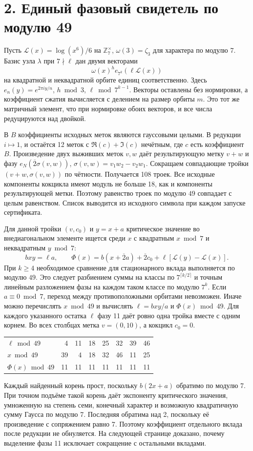 \documentclass[11pt,a4paper]{article}
\newcommand{\Z}{\mathbb Z}
\newcommand{\sect}[1]{\section*{\sffamily\color{ink}#1}}
\begin{document}
\newpage
\sect{2. Единый фазовый свидетель по модулю 49}
Пусть \(\mathcal L(x)=\log(x^6)/6\) на \(\Z_7^\times\), \(\omega(3)=\zeta_3\) для характера по модулю 7. Базис узла \(\lambda\) при \(7\nmid\ell\) дан двумя векторами
\[
   \omega(x)^h e_{7^k}(\ell\mathcal L(x))
\]
на квадратной и неквадратной орбите единиц соответственно. Здесь \(e_n(y)=e^{2\pi i y/n}\), \(h\bmod3\), \(\ell\bmod7^{k-1}\). Векторы оставлены без нормировки, а коэффициент сжатия вычисляется с делением на размер орбиты \(m\). Это тот же матричный элемент, что при нормировке обоих векторов, и все числа редуцируются над двойкой.

В \(B\) коэффициенты исходных меток являются гауссовыми целыми. В редукции \(i\mapsto1\), и остаётся 12 меток с \(\Re(c)+\Im(c)\) нечётным, где \(c\) есть коэффициент \(B\). Произведение двух выживших меток \(v,w\) даёт результирующую метку \(v+w\) и фазу \(e_N(\overline2\sigma(v,w))\), \(\sigma(v,w)=v_1w_2-v_2w_1\). Сокращаем совпадающие тройки \((v+w,\sigma(v,w))\) по чётности. Получается 108 троек. Все исходные компоненты кокцикла имеют модуль не больше 18, как и компоненты результирующей метки. Поэтому равенство троек по модулю \(49\) совпадает с целым равенством. Список выводится из исходного символа при каждом запуске сертификата.

Для данной тройки \((v,c_0)\) и \(y=x+a\) критическое значение во внедиагональном элементе ищется среди \(x\) с квадратным \(x\bmod7\) и неквадратным \(y\bmod7\):
\[
   bxy=\ell a,\qquad
   \Phi(x)=b(x+\overline2 a)+\overline2 c_0
                          +\ell[\mathcal L(y)-\mathcal L(x)] .  \tag{3}
\]
При \(k\ge4\) необходимое сравнение для стационарного вклада выполняется по модулю \(49\). Это следует разбиением суммы на классы по \(7^{\lceil k/2\rceil}\) и точным линейным разложением фазы на каждом таком классе по модулю \(7^k\). Если \(a\equiv0\bmod7\), переход между противоположными орбитами невозможен. Иначе можно перечислять \(x\bmod49\) и вычислять \(\ell=bxy/a\) и \(\Phi(x)\bmod49\). Для каждого указанного остатка \(\ell\) фазу 11 даёт ровно одна тройка вместе с одним корнем. Во всех столбцах метка \(v=(0,10)\), а кокцикл \(c_0=0\).
\begin{center}
\begin{tabular}{lrrrrrrr}
\toprule
\(\ell\bmod49\) & 4 & 11 & 18 & 25 & 32 & 39 & 46\\
\(x\bmod49\) & 39 & 4 & 18 & 32 & 46 & 11 & 25\\
\(\Phi(x)\bmod49\) & 11 & 11 & 11 & 11 & 11 & 11 & 11\\
\bottomrule
\end{tabular}
\end{center}
Каждый найденный корень прост, поскольку \(b(2x+a)\) обратимо по модулю 7. При точном подъёме такой корень даёт экспоненту критического значения, умноженную на степень семи, конечный характер и возможную квадратичную сумму Гаусса по модулю 7. Последняя обратима над 2, поскольку её произведение с сопряжением равно 7. Поэтому коэффициент отдельного вклада после редукции не обнуляется. На следующей странице доказано, почему выделение фазы 11 исключает сокращение с остальными вкладами.
\end{document}
